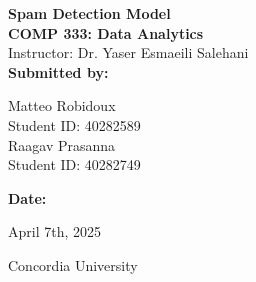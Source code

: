 \documentclass{article}
\begin{document}
\begin{titlepage}
    \centering
    \vspace{2cm}
    
    {\huge \textbf{Spam Detection Model}}\\[1.5cm]
    
    {\large \textbf{COMP 333: Data Analytics}}\\[0.5cm]
    
    {\large Instructor: Dr. Yaser Esmaeili Salehani}\\[1.5cm]
    
    {\large \textbf{Submitted by:}}\\[0.5cm]
    \begin{large}
        Matteo Robidoux\\
        Student ID: 40282589\\[0.5cm]
        Raagav Prasanna\\
        Student ID: 40282749\\[1.5cm]
    \end{large}
    
    {\large \textbf{Date:}}\\[0.5cm]
    \begin{large}
        April 7th, 2025\\[1.5cm]
    \end{large}
    
    \vfill
    
    {\large Concordia University}
    
\end{titlepage}
\end{document}

